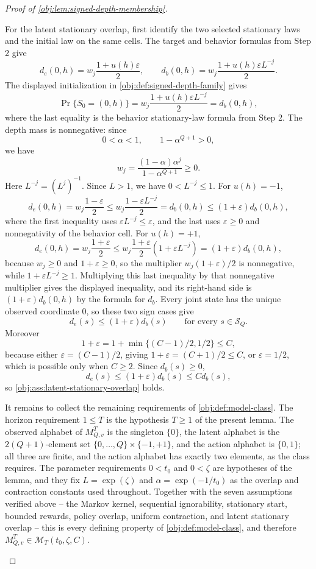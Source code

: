 \begin{proof}[Proof of \cref{obj:lem:signed-depth-membership}]
\begin{enumerate}
For the latent stationary overlap, first identify the two selected stationary
laws and the initial law on the same cells.  The target and behavior formulas
from Step 2 give
\[
d_e(0,h)
=
w_j\frac{1+u(h)\varepsilon}{2},
\qquad
d_b(0,h)
=
w_j\frac{1+u(h)\varepsilon L^{-j}}{2}.
\]
The displayed initialization in \cref{obj:def:signed-depth-family} gives
\[
\Pr\{S_0=(0,h)\}
=
w_j\frac{1+u(h)\varepsilon L^{-j}}{2}
=
d_b(0,h),
\]
where the last equality is the behavior stationary-law formula from Step 2.
The depth mass is nonnegative: since
\[
0<\alpha<1,
\qquad
1-\alpha^{Q+1}>0,
\]
we have
\[
w_j
=
\frac{(1-\alpha)\alpha^j}{1-\alpha^{Q+1}}
\ge0 .
\]
Here \(L^{-j}=(L^j)^{-1}\).  Since \(L>1\), we have \(0<L^{-j}\le1\).
For \(u(h)=-1\),
\[
d_e(0,h)
=
w_j\frac{1-\varepsilon}{2}
\le
w_j\frac{1-\varepsilon L^{-j}}2
=
d_b(0,h)
\le
(1+\varepsilon)d_b(0,h),
\]
where the first inequality uses \(\varepsilon L^{-j}\le\varepsilon\), and the
last uses \(\varepsilon\ge0\) and nonnegativity of the behavior cell.  For
\(u(h)=+1\),
\[
d_e(0,h)
=
w_j\frac{1+\varepsilon}{2}
\le
w_j\frac{1+\varepsilon}{2}(1+\varepsilon L^{-j})
=
(1+\varepsilon)d_b(0,h),
\]
because \(w_j\ge0\) and \(1+\varepsilon\ge0\), so the multiplier
\(w_j(1+\varepsilon)/2\) is nonnegative, while
\(1+\varepsilon L^{-j}\ge1\).  Multiplying this last inequality by that
nonnegative multiplier gives the displayed inequality, and its right-hand
side is \((1+\varepsilon)d_b(0,h)\) by the formula for \(d_b\).  Every joint state has the unique
observed coordinate \(0\), so these two sign cases give
\[
d_e(s)\le (1+\varepsilon)d_b(s)
\qquad\text{for every }s\in\mathcal S_Q.
\]
Moreover
\[
1+\varepsilon
=
1+\min\{(C-1)/2,1/2\}
\le C,
\]
because either \(\varepsilon=(C-1)/2\), giving
\(1+\varepsilon=(C+1)/2\le C\), or \(\varepsilon=1/2\), which is possible only
when \(C\ge2\).  Since \(d_b(s)\ge0\),
\[
d_e(s)\le (1+\varepsilon)d_b(s)\le C d_b(s),
\]
so \cref{obj:ass:latent-stationary-overlap} holds.

It remains to collect the remaining requirements of \cref{obj:def:model-class}.
The horizon requirement \(1\le T\) is the hypothesis \(T\ge1\) of the present
lemma.  The observed alphabet of \(M_{Q,v}^T\) is the singleton \(\{0\}\), the
latent alphabet is the \(2(Q+1)\)-element set
\(\{0,\ldots,Q\}\times\{-1,+1\}\), and the action alphabet is \(\{0,1\}\); all
three are finite, and the action alphabet has exactly two elements, as the
class requires.  The parameter requirements \(0<t_0\) and \(0<\zeta\) are
hypotheses of the lemma, and they fix \(L=\exp(\zeta)\) and
\(\alpha=\exp(-1/t_0)\) as the overlap and contraction constants used
throughout.  Together with the seven assumptions verified above -- the Markov
kernel, sequential ignorability, stationary start, bounded rewards, policy
overlap, uniform contraction, and latent stationary overlap -- this is every
defining property of \cref{obj:def:model-class}, and therefore
\(M_{Q,v}^T\in\mathcal M_T(t_0,\zeta,C)\).


\end{enumerate}
\end{proof}

